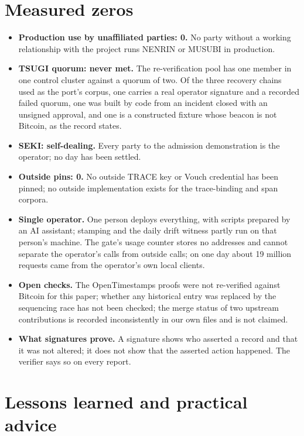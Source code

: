 \documentclass[preprint,12pt,authoryear]{elsarticle}
\begin{document}
\section{Measured zeros}\label{sec:zeros}

\begin{itemize}
\item \textbf{Production use by unaffiliated parties: 0.} No party without a working relationship with the project runs NENRIN or MUSUBI in production.
\item \textbf{TSUGI quorum: never met.} The re-verification pool has one member in one control cluster against a quorum of two. Of the three recovery chains used as the port's corpus, one carries a real operator signature and a recorded failed quorum, one was built by code from an incident closed with an unsigned approval, and one is a constructed fixture whose beacon is not Bitcoin, as the record states.
\item \textbf{SEKI: self-dealing.} Every party to the admission demonstration is the operator; no day has been settled.
\item \textbf{Outside pins: 0.} No outside TRACE key or Vouch credential has been pinned; no outside implementation exists for the trace-binding and span corpora.
\item \textbf{Single operator.} One person deploys everything, with scripts prepared by an AI assistant; stamping and the daily drift witness partly run on that person's machine. The gate's usage counter stores no addresses and cannot separate the operator's calls from outside calls; on one day about 19 million requests came from the operator's own local clients.
\item \textbf{Open checks.} The OpenTimestamps proofs were not re-verified against Bitcoin for this paper; whether any historical entry was replaced by the sequencing race has not been checked; the merge status of two upstream contributions is recorded inconsistently in our own files and is not claimed.
\item \textbf{What signatures prove.} A signature shows who asserted a record and that it was not altered; it does not show that the asserted action happened. The verifier says so on every report.
\end{itemize}

\section{Lessons learned and practical advice}\label{sec:lessons}
\end{document}
